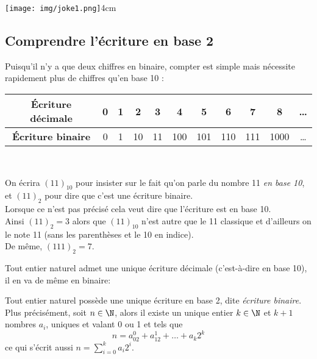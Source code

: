 \documentclass[a4paper,12pt,french]{book}
\begin{document}
{\texttt{[image: img/joke1.png]}}{4cm}
\subsection{Comprendre l'écriture en base 2}

Puisqu'il n'y a que deux chiffres en binaire, compter est simple mais nécessite rapidement plus de chiffres qu'en base 
10 :\\
\begin{center}
\begin{tabular}{|c|c|c|c|c|c|c|c|c|c|c|}
\hline 
\textbf{\'Ecriture décimale} & 0 & 1 & 2 & 3 & 4 & 5 & 6 & 7 & 8 & \dots\\ 
\hline 
\textbf{\'Ecriture binaire} & 0 & 1 & 10 & 11 & 100 & 101 & 110 & 111 & 1000 &\dots\\ 
\hline 
\end{tabular} \\[1em]
\end{center}

\begin{notation}
On écrira $(11)_{10}$ pour insister sur le fait qu'on parle du nombre 11 \textit{en base 10}, et $(11)_2$ pour dire que c'est une écriture 
binaire.\\
Lorsque ce n'est pas précisé cela veut dire que l'écriture est en base 10.\\
Ainsi $(11)_2=3$ alors que $(11)_{10}$ n'est autre que le 11 \og classique\fg{} et d'ailleurs on le note 11 (sans les parenthèses et le 10 en 
indice).\\
De même, $(111)_2=7$.\\
\end{notation}
Tout entier naturel admet une unique écriture décimale (c'est-à-dire en base 10), il en va de même en binaire:
\begin{propriete}
Tout entier naturel possède une unique écriture en base 2, dite \textit{écriture binaire}.
Plus précisément, soit $n\in\N$, alors il existe un unique entier $k\in\N$ et $k+1$ nombres $a_i$, uniques et valant 0 
ou 1 et tels que $$n=a_02^0+a_12^1+\ldots+a_k2^k$$
ce qui s'écrit aussi $\displaystyle n=\sum_{i=0}^ka_i2^i$.
\end{propriete}
\end{document}
